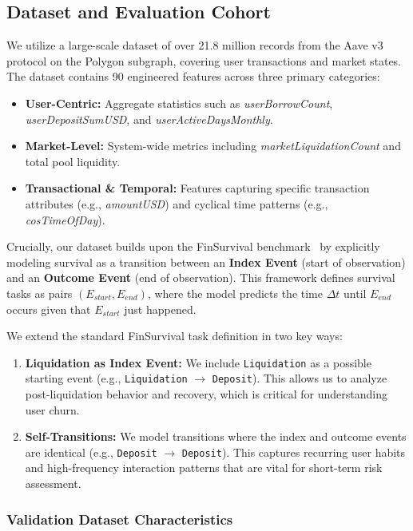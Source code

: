 \documentclass[manuscript,screen,review]{acmart}
\begin{document}
\subsection{Dataset and Evaluation Cohort}
\label{sec:dataset}
We utilize a large-scale dataset of over 21.8 million records from the Aave v3 protocol on the Polygon subgraph, covering user transactions and market states. The dataset contains 90 engineered features across three primary categories:
\begin{itemize}
    \item \textbf{User-Centric:} Aggregate statistics such as \textit{userBorrowCount}, \textit{userDepositSumUSD}, and \textit{userActiveDaysMonthly}.
    \item \textbf{Market-Level:} System-wide metrics including \textit{marketLiquidationCount} and total pool liquidity.
    \item \textbf{Transactional \& Temporal:} Features capturing specific transaction attributes (e.g., \textit{amountUSD}) and cyclical time patterns (e.g., \textit{cosTimeOfDay}).
\end{itemize}

Crucially, our dataset builds upon the FinSurvival benchmark~\cite{green2025finsurvival} by explicitly modeling survival as a transition between an \textbf{Index Event} (start of observation) and an \textbf{Outcome Event} (end of observation). This framework defines survival tasks as pairs $(E_{start}, E_{end})$, where the model predicts the time $\Delta t$ until $E_{end}$ occurs given that $E_{start}$ just happened. 

We extend the standard FinSurvival task definition in two key ways:
\begin{enumerate}
    \item \textbf{Liquidation as Index Event:} We include \texttt{Liquidation} as a possible starting event (e.g., \texttt{Liquidation} $\to$ \texttt{Deposit}). This allows us to analyze post-liquidation behavior and recovery, which is critical for understanding user churn.
    \item \textbf{Self-Transitions:} We model transitions where the index and outcome events are identical (e.g., \texttt{Deposit} $\to$ \texttt{Deposit}). This captures recurring user habits and high-frequency interaction patterns that are vital for short-term risk assessment.
\end{enumerate}

\subsubsection{Validation Dataset Characteristics}
\label{sec:dataset-characteristics}
\end{document}
